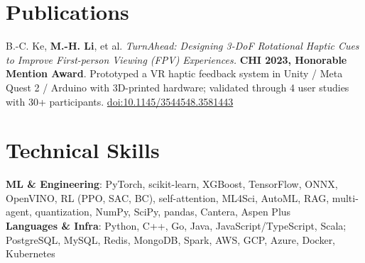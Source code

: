 \documentclass[letterpaper,11pt]{article}
\begin{document}
\section{Publications}
\small B.-C. Ke, \textbf{M.-H. Li}, et al. \textit{TurnAhead: Designing 3-DoF Rotational Haptic Cues to Improve First-person Viewing (FPV) Experiences.} \textbf{CHI 2023, Honorable Mention Award}. Prototyped a VR haptic feedback system in Unity / Meta Quest 2 / Arduino with 3D-printed hardware; validated through 4 user studies with 30+ participants. \href{https://dl.acm.org/doi/10.1145/3544548.3581443}{doi:10.1145/3544548.3581443}


\section{Technical Skills}
 \begin{itemize}[leftmargin=0.15in, label={}]
    \small{\item{
\textbf{ML \& Engineering}{: PyTorch, scikit-learn, XGBoost, TensorFlow, ONNX, OpenVINO, RL (PPO, SAC, BC), self-attention, ML4Sci, AutoML, RAG, multi-agent, quantization, NumPy, SciPy, pandas, Cantera, Aspen Plus} \\
\textbf{Languages \& Infra}{: Python, C++, Go, Java, JavaScript/TypeScript, Scala; PostgreSQL, MySQL, Redis, MongoDB, Spark, AWS, GCP, Azure, Docker, Kubernetes}
    }}
 \end{itemize}
\end{document}
